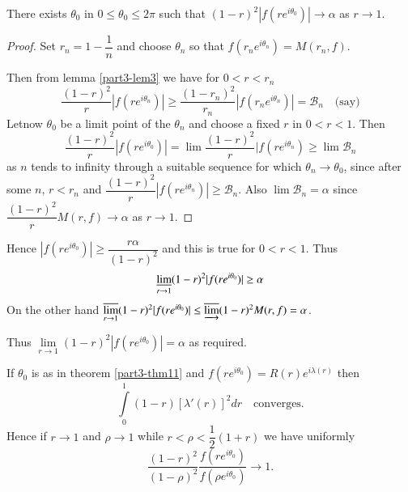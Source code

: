 \begin{thm}\label{part3-thm11}
There exists $\theta_{0}$ in $0\leq \theta_{0}\leq 2\pi$ such that
$(1-r)^{2}|f(re^{i\theta_0})|\to \alpha$ as $r\to 1$.
\end{thm}

\begin{proof}
Set $r_{n}=1-\dfrac{1}{n}$ and choose $\theta_{n}$ so that
$f(r_{n}e^{i\theta_n})=M(r_{n},f)$. 

Then from lemma \ref{part3-lem3} we have for $0<r<r_{n}$
$$
\frac{(1-r)^{2}}{r}|f(re^{i\theta_n})|\geq
\frac{(1-r_{n})^{2}}{r_{n}}|f(r_{n}e^{i\theta_n})|=\mathscr{B}_{n}\quad
\text{(say)} 
$$
Let\pageoriginale now $\theta_{0}$ be a limit point of the
$\theta_{n}$ and choose a fixed $r$ in $0<r<1$. Then
$$
\frac{(1-r)^{2}}{r}|f(re^{i\theta_0})|=\lim
\frac{(1-r)^{2}}{r}|f(re^{i\theta_n})\geq \lim\mathscr{B}_{n}
$$
as $n$ tends to infinity through a suitable sequence for which
$\theta_{n}\to \theta_{0}$, since after some $n$, $r<r_{n}$ and
$\dfrac{(1-r)^{2}}{r}|f(re^{i\theta_{n}})|\geq \mathscr{B}_{n}$. Also
$\lim \mathscr{B}_{n}=\alpha$ since $\dfrac{(1-r)^{2}}{r}M(r,f)\to
\alpha$ as $r\to 1$.
\end{proof}

Hence $|f(re^{i\theta_{0}})|\geq \dfrac{r\alpha}{(1-r)^{2}}$ and this
is true for $0<r<1$. Thus
$$
\mathop{\underline{\lim}}\limits_{r\to 1}(1-r)^{2}|f(re^{i\theta_{0}})|\geq
\alpha
$$
On the other hand $\mathop{\overline{\lim}}\limits_{r\to
  1}(1-r)^{2}|f(re^{i\theta_{0}})|\leq
\overline{\varinjlim}(1-r)^{2}M(r,f)=\alpha$. 

Thus $\lim\limits_{r\to 1}(1-r)^{2}|f(re^{i\theta_{0}})|=\alpha$ as
required.

\begin{thm}\label{part3-thm12}
If $\theta_{0}$ is as in theorem \ref{part3-thm11} and
$f(re^{i\theta_{0}})=R(r)e^{i\lambda(r)}$ then
$$
\int\limits^{1}_{0}(1-r)[\lambda'(r)]^{2}dr\quad\text{converges.}
$$
Hence if $r\to 1$ and $\rho\to 1$ while $r<\rho<\dfrac{1}{2}(1+r)$ we
have uniformly
$$
\frac{(1-r)^{2}}{(1-\rho)^{2}}\frac{f(re^{i\theta_{0}})}{f(\rho
  e^{i\theta_{0}})}\to 1.
$$
\end{thm}

